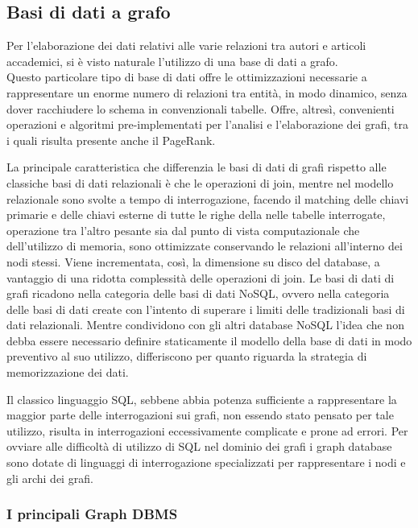 \documentclass[a4paper,12pt]{article}
\begin{document}
\subsection{Basi di dati a grafo}
Per l'elaborazione dei dati relativi alle varie relazioni tra autori e articoli accademici, si è visto naturale l'utilizzo di una base di dati a grafo. \\
Questo particolare tipo di base di dati offre le ottimizzazioni necessarie a rappresentare un enorme numero di relazioni tra entità, in modo dinamico, senza dover racchiudere lo schema in convenzionali tabelle. Offre, altresì, convenienti operazioni e algoritmi pre-implementati per l'analisi e l'elaborazione dei grafi, tra i quali risulta presente anche il PageRank.
\par
La principale caratteristica che differenzia le basi di dati di grafi rispetto alle classiche basi di dati relazionali è che le operazioni di join, mentre nel modello relazionale sono svolte a tempo di interrogazione, facendo il matching delle chiavi primarie e delle chiavi esterne di tutte le righe della nelle tabelle interrogate, operazione tra l'altro pesante sia dal punto di vista computazionale che dell'utilizzo di memoria, sono ottimizzate conservando le relazioni all'interno dei nodi stessi. Viene incrementata, così, la dimensione su disco del database, a vantaggio di una ridotta complessità delle operazioni di join.
Le basi di dati di grafi ricadono nella categoria delle basi di dati NoSQL, ovvero nella categoria delle basi di dati create con l'intento di superare i limiti delle tradizionali basi di dati relazionali. Mentre condividono con gli altri database NoSQL l'idea che non debba essere necessario definire staticamente il modello della base di dati in modo preventivo al suo utilizzo, differiscono per quanto riguarda la strategia di memorizzazione dei dati.
\par
Il classico linguaggio SQL, sebbene abbia potenza sufficiente a rappresentare la maggior parte delle interrogazioni sui grafi, non essendo stato pensato per tale utilizzo, risulta in interrogazioni eccessivamente complicate e prone ad errori. Per ovviare alle difficoltà di utilizzo di SQL nel dominio dei grafi i graph database sono dotate di linguaggi di interrogazione specializzati per rappresentare i nodi e gli archi dei grafi.

\subsubsection{I principali Graph DBMS}
\end{document}
